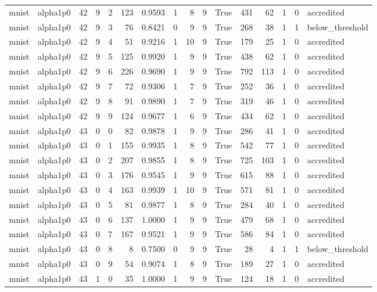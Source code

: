 \begin{tabular}{llrrrrrrrrrrrrrl}
mnist & alpha1p0 & 42 & 9 & 2 & 123 & 0.9593 & 1 & 8 & 9 & True & 431 & 62 & 1 & 0 & accredited \\
mnist & alpha1p0 & 42 & 9 & 3 & 76 & 0.8421 & 0 & 9 & 9 & True & 268 & 38 & 1 & 1 & below\_threshold \\
mnist & alpha1p0 & 42 & 9 & 4 & 51 & 0.9216 & 1 & 10 & 9 & True & 179 & 25 & 1 & 0 & accredited \\
mnist & alpha1p0 & 42 & 9 & 5 & 125 & 0.9920 & 1 & 9 & 9 & True & 438 & 62 & 1 & 0 & accredited \\
mnist & alpha1p0 & 42 & 9 & 6 & 226 & 0.9690 & 1 & 9 & 9 & True & 792 & 113 & 1 & 0 & accredited \\
mnist & alpha1p0 & 42 & 9 & 7 & 72 & 0.9306 & 1 & 7 & 9 & True & 252 & 36 & 1 & 0 & accredited \\
mnist & alpha1p0 & 42 & 9 & 8 & 91 & 0.9890 & 1 & 7 & 9 & True & 319 & 46 & 1 & 0 & accredited \\
mnist & alpha1p0 & 42 & 9 & 9 & 124 & 0.9677 & 1 & 6 & 9 & True & 434 & 62 & 1 & 0 & accredited \\
mnist & alpha1p0 & 43 & 0 & 0 & 82 & 0.9878 & 1 & 9 & 9 & True & 286 & 41 & 1 & 0 & accredited \\
mnist & alpha1p0 & 43 & 0 & 1 & 155 & 0.9935 & 1 & 8 & 9 & True & 542 & 77 & 1 & 0 & accredited \\
mnist & alpha1p0 & 43 & 0 & 2 & 207 & 0.9855 & 1 & 8 & 9 & True & 725 & 103 & 1 & 0 & accredited \\
mnist & alpha1p0 & 43 & 0 & 3 & 176 & 0.9545 & 1 & 9 & 9 & True & 615 & 88 & 1 & 0 & accredited \\
mnist & alpha1p0 & 43 & 0 & 4 & 163 & 0.9939 & 1 & 10 & 9 & True & 571 & 81 & 1 & 0 & accredited \\
mnist & alpha1p0 & 43 & 0 & 5 & 81 & 0.9877 & 1 & 8 & 9 & True & 284 & 40 & 1 & 0 & accredited \\
mnist & alpha1p0 & 43 & 0 & 6 & 137 & 1.0000 & 1 & 9 & 9 & True & 479 & 68 & 1 & 0 & accredited \\
mnist & alpha1p0 & 43 & 0 & 7 & 167 & 0.9521 & 1 & 9 & 9 & True & 586 & 84 & 1 & 0 & accredited \\
mnist & alpha1p0 & 43 & 0 & 8 & 8 & 0.7500 & 0 & 9 & 9 & True & 28 & 4 & 1 & 1 & below\_threshold \\
mnist & alpha1p0 & 43 & 0 & 9 & 54 & 0.9074 & 1 & 8 & 9 & True & 189 & 27 & 1 & 0 & accredited \\
mnist & alpha1p0 & 43 & 1 & 0 & 35 & 1.0000 & 1 & 9 & 9 & True & 124 & 18 & 1 & 0 & accredited \\

\end{tabular}

